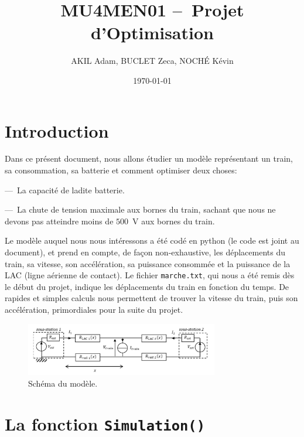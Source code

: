 \documentclass[11pt, a4paper, oneside, portrait]{report}
\title{\textbf{MU4MEN01 --~Projet d'Optimisation}}
\author{AKIL Adam, BUCLET Zeca, NOCHÉ Kévin} %
\date{\today}
\begin{document}
    \maketitle\thispagestyle{empty} %
    \newpage\tableofcontents\thispagestyle{empty}

    \newpage\setcounter{page}{1} %


    \section*{Introduction}
        Dans ce présent document, nous allons étudier un modèle représentant un train, sa consommation, sa batterie et comment optimiser deux choses:

        ---~La capacité de ladite batterie.

        ---~La chute de tension maximale aux bornes du train, sachant que nous ne devons pas atteindre moins de $500$~V aux bornes du train.

        Le modèle auquel nous nous intéressons a été codé en python (le code est joint au document), et prend en compte, de façon non-exhaustive, les déplacements du train, sa vitesse, son accélération, sa puissance consommée et la puissance de la LAC (ligne aérienne de contact).
        Le fichier \texttt{marche.txt}, qui nous a été remis dès le début du projet, indique les déplacements du train en fonction du temps.
        De rapides et simples calculs nous permettent de trouver la vitesse du train, puis son accélération, primordiales pour la suite du projet.

        \begin{figure}[H]
            \centering
            \includegraphics[width=0.75\textwidth]{Figures/Schematic.png}
            \caption{Schéma du modèle.}
            \label{fig:Schematic}
        \end{figure}

    \section*{La fonction \texttt{Simulation()}}
\end{document}
